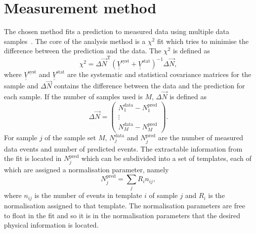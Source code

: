 \section{Measurement method}
\label{sec:MeasurementMethod}
The chosen method fits a prediction to measured data using multiple data samples~\cite{PhysRevD.78.032003, PhysRevD.83.012005}.   The core of the analysis method is a $\chi^2$ fit which tries to minimise the difference between the prediction and the data.  The $\chi^2$ is defined as 
\begin{equation}
  \chi^2 = \Delta \vec{N}^{\textrm{T}} \left(\underline{\underline{V}}^{\textrm{syst}} + \underline{\underline{V}}^{\textrm{stat}} \right)^{-1} \Delta \vec{N},
  \label{eqn:Chi2Def}
\end{equation}
where $\underline{\underline{V}}^{\textrm{syst}}$ and $\underline{\underline{V}}^{\textrm{stat}}$ are the systematic and statistical covariance matrices for the sample and $\Delta\vec{N}$ contains the difference between the data and the prediction for each sample.  If the number of samples used is $M$, $\Delta\vec{N}$ is defined as 
\begin{equation}
  \Delta\vec{N} = 
  \begin{pmatrix}
    N^{\textrm{data}}_1 - N^{\textrm{pred}}_1 \\
    \vdots \\
    N^{\textrm{data}}_M - N^{\textrm{pred}}_M
  \end{pmatrix}.
  \label{eqn:VecNDef}
\end{equation}
For sample $j$ of the sample set $M$, $N^{\textrm{data}}_j$ and $N^{\textrm{pred}}_j$ are the number of measured data events and number of predicted events.  The extractable information from the fit is located in $N^{\textrm{pred}}_j$ which can be subdivided into a set of templates, each of which are assigned a normalisation parameter, namely
\begin{equation}
  N^{\textrm{pred}}_j = \sum_j R_{i}n_{ij},
  \label{eqn:NPredDef}
\end{equation}
where $n_{ij}$ is the number of events in template $i$ of sample $j$ and $R_{i}$ is the normalisation assigned to that template.  The normalisation parameters are free to float in the fit and so it  is in the normalisation parameters that the desired physical information is located.
